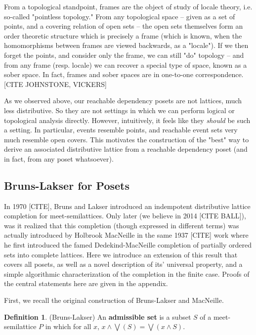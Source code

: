 \documentclass[hoptionsi,review,format=acmsmall]{acmart}
\theoremstyle{definition}
\newtheorem{definition}{Definition}[section]
\begin{document}
From a topological standpoint, frames are the object of study of locale theory, i.e. so-called "pointless topology." From any topological space -- given as a set of points, and a covering relation of open sets -- the open sets themselves form an order theoretic structure which is precisely a frame (which is known, when the homomorphisms between frames are viewed backwards, as a "locale"). If we then forget the points, and consider only the frame, we can still "do" topology -- and from any frame (resp. locale) we can recover a special type of space, known as a sober space. In fact, frames and sober spaces are in one-to-one correspondence. [CITE JOHNSTONE, VICKERS]

As we observed above, our reachable dependency posets are not lattices, much less distributive. So they are not settings in which we can perform logical or topological analysis directly. However, intuitively, it feels like they \textit{should} be such a setting. In particular, events resemble points, and reachable event sets very much resemble open covers. This motivates the construction of the "best" way to derive an associated distributive lattice from a reachable dependency poset (and in fact, from any poset whatsoever).

\subsection{Bruns-Lakser for Posets}

In 1970 [CITE], Bruns and Lakser introduced an indempotent distributive lattice completion for meet-semilattices. Only later (we believe in 2014 [CITE BALL]), was it realized that this completion (though expressed in different terms) was actually introduced by  Holbrook MacNeille in the same 1937 [CITE] work where he first introduced the famed Dedekind-MacNeille completion of partially ordered sets into complete lattices. Here we introduce an extension of this result that covers all posets, as well as a novel description of its' universal property, and a simple algorithmic characterization of the completion in the finite case. Proofs of the central statements here are given in the appendix.

First, we recall the original construction of Bruns-Lakser and MacNeille.

\begin{definition}
(Bruns-Lakser) An \textbf{admissible set} is a subset \(S\) of a meet-semilattice \(P\) in which for all \(x\), \(x \wedge \bigvee(S) = \bigvee(x \wedge S)\).
\end{definition}
\end{document}
